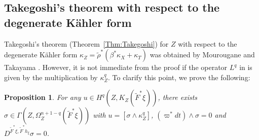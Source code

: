 \documentclass[amscd, leqno]{amsart}
\theoremstyle{plain}
\newtheorem{proposition}[theorem]{Proposition}
\theoremstyle{definition}
\theoremstyle{remark}
\begin{document}
\subsection
{Takegoshi's theorem with respect to the degenerate K\"ahler form}
\label{sect:9.2}
\par
Takegoshi's theorem (Theorem~\ref{Thm:Takegoshi}) for $Z$ with respect to the degenerate K\"ahler form 
$\kappa_{Z}=\widetilde{\rho}^{*}(\beta^{*}\kappa_{X}+\kappa_{T})$ was obtained by 
Mourougane and Takayama \cite[Prop.\,4.4]{MourouganeTakayama09}.
However, it is not immediate from the proof if the operator $L^{q}$ in \cite[Prop.\,4.4]{MourouganeTakayama09} is given by 
the multiplication by $\kappa_{Z}^{q}$. To clarify this point, we prove the following:


\begin{proposition}
\label{prop:Takegoshi:sing}
For any $u\in H^{q}(Z, K_{Z}(\widetilde{F}^{*}\xi))$, there exists $\sigma \in \Gamma(Z,\Omega_{Z}^{n+1-q}(\widetilde{F}^{*}\xi))$ with
$u=[\sigma\wedge\kappa_{Z}^{q}]$, $(\varpi^{*}dt)\wedge\sigma=0$ and $D^{\widetilde{F}^{*}\xi, \widetilde{F}^{*}h_{\xi}} \sigma =0$.
\end{proposition}
\end{document}
